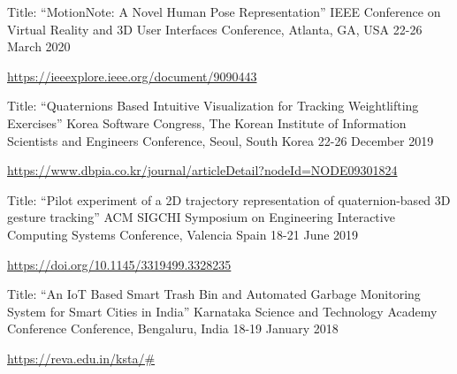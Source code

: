 \begin{cventries}
  \cventry
    {Title: “MotionNote: A Novel Human Pose Representation”} %
    {IEEE Conference on Virtual Reality and 3D User Interfaces} %
    {Conference, Atlanta, GA, USA} %
    {22-26 March 2020} %
    {
      \begin{cvitems} %
        \item{\url{https://ieeexplore.ieee.org/document/9090443}}
      \end{cvitems}
    }

\cventry
    {Title: “Quaternions Based Intuitive Visualization for Tracking Weightlifting Exercises”} %
    {Korea Software Congress, The Korean Institute of Information Scientists and Engineers} %
    {Conference, Seoul, South Korea} %
    {22-26 December 2019} %
    {
      \begin{cvitems} %
        \item{\url{https://www.dbpia.co.kr/journal/articleDetail?nodeId=NODE09301824}}
      \end{cvitems}
    }
    

\cventry
    {Title: “Pilot experiment of a 2D trajectory representation of quaternion-based 3D gesture tracking”} %
    {ACM SIGCHI Symposium on Engineering Interactive Computing Systems} %
    {Conference, Valencia Spain} %
    {18-21 June 2019} %
    {
      \begin{cvitems} %
        \item{\url{https://doi.org/10.1145/3319499.3328235}}
      \end{cvitems}
    }
    

\cventry
    {Title: “An IoT Based Smart Trash Bin and Automated Garbage Monitoring System for Smart Cities in India”} %
    {Karnataka Science and Technology Academy Conference} %
    {Conference, Bengaluru, India} %
    {18-19 January 2018} %
    {
      \begin{cvitems} %
        \item{\url{https://reva.edu.in/ksta/#}}
      \end{cvitems}
    }
    


\end{cventries}
